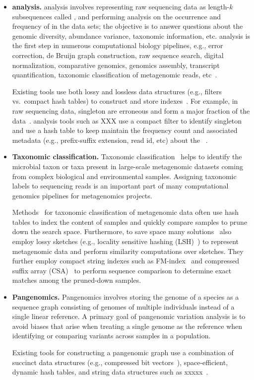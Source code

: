 \begin{itemize}[leftmargin=*]

\item {\bf \Kmer analysis.}
\Kmer analysis involves representing raw sequencing data as length-$k$ subsequences called \kmers, and performing analysis on the occurrence and frequency of \kmers in the data sets; the objective is to answer questions about the genomic diversity, abundance variance, taxonomic information, etc.
\Kmer analysis is the first step in numerous computational biology pipelines, e.g., error correction, de Bruijn graph construction, raw sequence search, digital normalization, comparative genomics, genomics assembly, transcript quantification, taxonomic classification of metagenomic reads, etc~\cite{xxxx}.

Existing tools use both lossy and lossless data structures (e.g., filters vs.\ compact hash tables) to construct and store \kmer indexes~\cite{xxxx}.
For example, in raw sequencing data, singleton \kmers are erroneous and form a major fraction of the data~\cite{xxxx}. \kmer analysis tools such as  XXX use a compact filter to identify singleton \kmers and use a hash table to keep maintain the frequency count and associated metadata (e.g., prefix-suffix extension, read id, etc) about the \kmers~\cite{xxxx}.

\item {\bf Taxonomic classification.} Taxonomic classification~\cite{something} helps to identify the microbial taxon or taxa present in large-scale  metagenomic datasets coming from complex biological and environmental samples. Assigning taxonomic labels to sequencing reads is an important part of many computational genomics pipelines for metagenomics
projects.

Methods~\cite{cite-something} for taxonomic classification of metagenomic data often use hash tables to index the \kmer content of samples and quickly compare samples to prune down the search space.
Furthermore, to save space many solutions~\cite{cite-something} also employ lossy sketches (e.g., locality sensitive hashing (LSH)~\cite{cite-something}) to represent metagenomic data and perform similarity computations over sketches.
They further employ compact string indexes such as FM-index~\cite{fmindex} and compressed suffix array (CSA)~\cite{csa} to perform sequence comparison to determine exact matches among the pruned-down samples.

\item {\bf Pangenomics.}
Pangenomics involves storing the genome of a species as a sequence graph consisting of genomes of multiple individuals instead of a single linear reference. A primary goal of pangenomic variation analysis is to avoid biases that arise when treating a single genome as the reference when identifying or comparing variants across samples in a population.

Existing tools for constructing a pangenomic graph use a combination of succinct data structures (e.g., compressed bit vectors~\cite{xxx}), space-efficient, dynamic hash tables, and string data structures such as xxxxx~\cite{xxx}.

\end{itemize}

